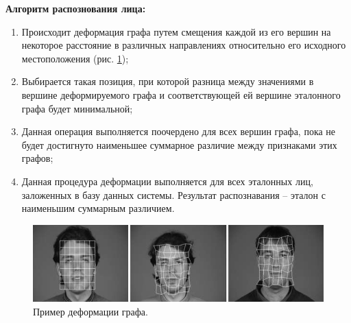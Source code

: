 \textbf{Алгоритм распознования лица:}
\begin{enumerate}
    \item Происходит деформация графа путем смещения каждой из его вершин на некоторое расстояние
    в различных направлениях относительно его исходного местоположения (рис. \ref{img:demonstration});
    \item Выбирается такая позиция, при которой разница между значениями в вершине деформируемого графа и 
    соответствующей ей вершине эталонного графа будет минимальной;
    \item Данная операция выполняется поочердено для всех вершин графа, пока не будет достигнуто наименьшее суммарное различие 
    между признаками этих графов;
    \item  Данная процедура деформации выполняется для всех эталонных лиц, заложенных в базу данных системы. 
    Результат распознавания -- эталон с наименьшим суммарным различием.
\end{enumerate}

\begin{figure}[h]
    \centering
    \includegraphics[height=0.15\textheight]{img/img_a.jpg}
    \caption{Пример деформации графа.}
    \label{img:demonstration}
\end{figure}
    
